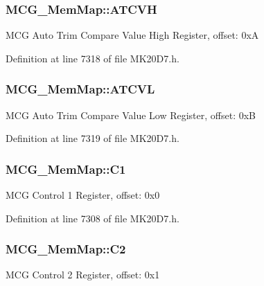 \subsubsection[{\texorpdfstring{A\+T\+C\+VH}{ATCVH}}]{ M\+C\+G\+\_\+\+Mem\+Map\+::\+A\+T\+C\+VH}\hypertarget{struct_m_c_g___mem_map_a74fee35955b4ec57aa8058bd57a926a8}{}\label{struct_m_c_g___mem_map_a74fee35955b4ec57aa8058bd57a926a8}
M\+CG Auto Trim Compare Value High Register, offset\+: 0xA 

Definition at line 7318 of file M\+K20\+D7.\+h.

\subsubsection[{\texorpdfstring{A\+T\+C\+VL}{ATCVL}}]{ M\+C\+G\+\_\+\+Mem\+Map\+::\+A\+T\+C\+VL}\hypertarget{struct_m_c_g___mem_map_a913b6fd7776c0377e299fdf0eeb166af}{}\label{struct_m_c_g___mem_map_a913b6fd7776c0377e299fdf0eeb166af}
M\+CG Auto Trim Compare Value Low Register, offset\+: 0xB 

Definition at line 7319 of file M\+K20\+D7.\+h.

\subsubsection[{\texorpdfstring{C1}{C1}}]{ M\+C\+G\+\_\+\+Mem\+Map\+::\+C1}\hypertarget{struct_m_c_g___mem_map_a433a36d1aeb9d033b502ee263c1495a1}{}\label{struct_m_c_g___mem_map_a433a36d1aeb9d033b502ee263c1495a1}
M\+CG Control 1 Register, offset\+: 0x0 

Definition at line 7308 of file M\+K20\+D7.\+h.

\subsubsection[{\texorpdfstring{C2}{C2}}]{ M\+C\+G\+\_\+\+Mem\+Map\+::\+C2}\hypertarget{struct_m_c_g___mem_map_a7323696b9a1cb6631b8c04ffad3947e5}{}\label{struct_m_c_g___mem_map_a7323696b9a1cb6631b8c04ffad3947e5}
M\+CG Control 2 Register, offset\+: 0x1 

